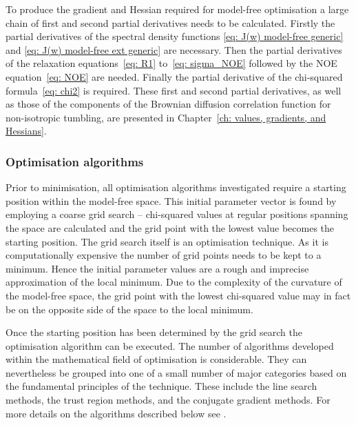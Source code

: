 \begin{htmlonly}
\begin{htmlonly}
To produce the gradient and Hessian required for model-free optimisation a large chain of first and second partial derivatives needs to be calculated.  Firstly the partial derivatives of the spectral density functions \eqref{eq: J(w) model-free generic} and \eqref{eq: J(w) model-free ext generic} are necessary.  Then the partial derivatives of the relaxation equations~\eqref{eq: R1} to~\eqref{eq: sigma_NOE} followed by the NOE equation~\eqref{eq: NOE} are needed.  Finally the partial derivative of the chi-squared formula~\eqref{eq: chi2} is required.  These first and second partial derivatives, as well as those of the components of the Brownian diffusion correlation function for non-isotropic tumbling, are presented in Chapter~\ref{ch: values, gradients, and Hessians}.



\subsubsection{Optimisation algorithms}

Prior to minimisation, all optimisation algorithms investigated require a starting position within the model-free space.  This initial parameter vector is found by employing a coarse grid search -- chi-squared values at regular positions spanning the space are calculated and the grid point with the lowest value becomes the starting position.  The grid search itself is an optimisation technique.  As it is computationally expensive the number of grid points needs to be kept to a minimum.  Hence the initial parameter values are a rough and imprecise approximation of the local minimum.  Due to the complexity of the curvature of the model-free space, the grid point with the lowest chi-squared value may in fact be on the opposite side of the space to the local minimum.

Once the starting position has been determined by the grid search the optimisation algorithm can be executed.  The number of algorithms developed within the mathematical field of optimisation is considerable.  They can nevertheless be grouped into one of a small number of major categories based on the fundamental principles of the technique.  These include the line search methods, the trust region methods, and the conjugate gradient methods.  For more details on the algorithms described below see \citet{NocedalWright99}.




\end{htmlonly}
\end{htmlonly}
